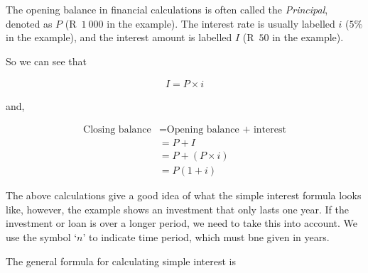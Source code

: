 The opening balance in financial calculations is often called the \textsl{Principal}, denoted as $P$ (R~$1~000$ in the example). The interest rate is usually labelled $i$ ($5\%$ in the example), and the interest amount is labelled $I$ (R~$50$ in the example).\par 

So we can see that
        
\begin{align*}
    I = P \times i
\end{align*}

and,

\begin{align*}
    \mbox{Closing balance} &= \mbox{Opening balance + interest} \nonumber\\
    &= P + I \nonumber\\
    &= P + (P \times i)\nonumber\\
    &= P(1 + i)
\end{align*}



The above calculations give a good idea of what the simple interest formula looks like, however, the example shows an investment that only lasts one year. If the investment or loan is over a longer period, we need to take this
into account. We use the symbol ‘$n$’ to indicate time period, which must bne given in years.\par

The general formula for calculating simple interest is





